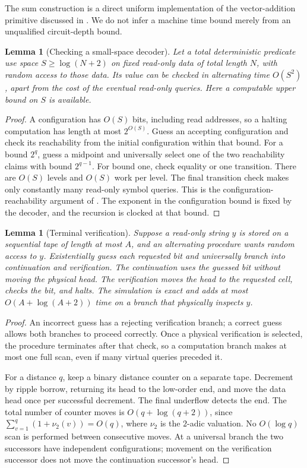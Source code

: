 \documentclass[11pt]{article}
\newtheorem{lemma}[theorem]{Lemma}
\theoremstyle{definition}
\theoremstyle{remark}
\begin{document}
The sum construction is a direct uniform implementation of the vector-addition primitive discussed in \cite{Buss87}. We do not infer a machine time bound merely from an unqualified circuit-depth bound.

\begin{lemma}[Checking a small-space decoder]\label{lem:reach}
Let a total deterministic predicate use space $S\ge\log(N+2)$ on fixed read-only data of total length $N$, with random access to those data. Its value can be checked in alternating time $O(S^2)$, apart from the cost of the eventual read-only queries. Here a computable upper bound on $S$ is available.
\end{lemma}

\begin{proof}
A configuration has $O(S)$ bits, including read addresses, so a halting computation has length at most $2^{O(S)}$. Guess an accepting configuration and check its reachability from the initial configuration within that bound. For a bound $2^q$, guess a midpoint and universally select one of the two reachability claims with bound $2^{q-1}$. For bound one, check equality or one transition. There are $O(S)$ levels and $O(S)$ work per level. The final transition check makes only constantly many read-only symbol queries. This is the configuration-reachability argument of \cite{CKS81}. The exponent in the configuration bound is fixed by the decoder, and the recursion is clocked at that bound.
\end{proof}

\begin{lemma}[Terminal verification]\label{lem:terminal}
Suppose a read-only string $y$ is stored on a sequential tape of length at most $A$, and an alternating procedure wants random access to $y$. Existentially guess each requested bit and universally branch into continuation and verification. The continuation uses the guessed bit without moving the physical head. The verification moves the head to the requested cell, checks the bit, and halts. The simulation is exact and adds at most $O(A+\log(A+2))$ time on a branch that physically inspects $y$.
\end{lemma}

\begin{proof}
An incorrect guess has a rejecting verification branch; a correct guess allows both branches to proceed correctly. Once a physical verification is selected, the procedure terminates after that check, so a computation branch makes at most one full scan, even if many virtual queries preceded it.

For a distance $q$, keep a binary distance counter on a separate tape. Decrement by ripple borrow, returning its head to the low-order end, and move the data head once per successful decrement. The final underflow detects the end. The total number of counter moves is $O(q+\log(q+2))$, since $\sum_{v=1}^q(1+\nu_2(v))=O(q)$, where $\nu_2$ is the $2$-adic valuation. No $O(\log q)$ scan is performed between consecutive moves. At a universal branch the two successors have independent configurations; movement on the verification successor does not move the continuation successor's head.
\end{proof}
\end{document}
